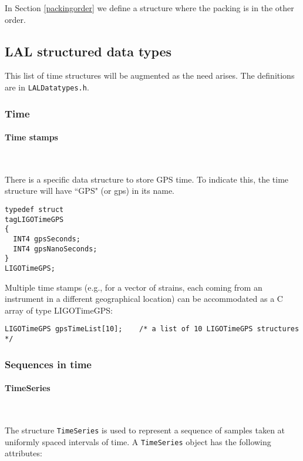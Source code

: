 \documentclass[]{ligodcc}
\renewcommand{\texttt}[1]{{\ttfamily\color{blue}#1}}
\begin{document}
In Section \ref{packingorder} we define a structure where the packing
is in the other order.

\subsection{LAL structured data types}
\label{structured}

This list of time structures will be augmented as the need arises. The
definitions are in {\tt LALDatatypes.h}.


\subsubsection{Time}

\paragraph{Time stamps }~

There is a specific data structure to store GPS time. To indicate
this, the time structure will have ``GPS" (or gps) in its name. 

{\footnotesize
\begin{verbatim}
typedef struct
tagLIGOTimeGPS
{
  INT4 gpsSeconds;
  INT4 gpsNanoSeconds;
}
LIGOTimeGPS;
\end{verbatim}}

Multiple time stamps (e.g., for a vector of strains, each coming from
an instrument in a different geographical location) can be
accommodated as a C array of type LIGOTimeGPS:
{\footnotesize
\begin{verbatim}
LIGOTimeGPS gpsTimeList[10];	/* a list of 10 LIGOTimeGPS structures */
\end{verbatim}}

\subsubsection{Sequences in time}


\paragraph{{\texttt {TimeSeries}} }~

The structure {\tt TimeSeries} is used to represent a sequence of samples
taken at uniformly spaced intervals of time. A {\tt TimeSeries} object has
the following attributes:
\end{document}
